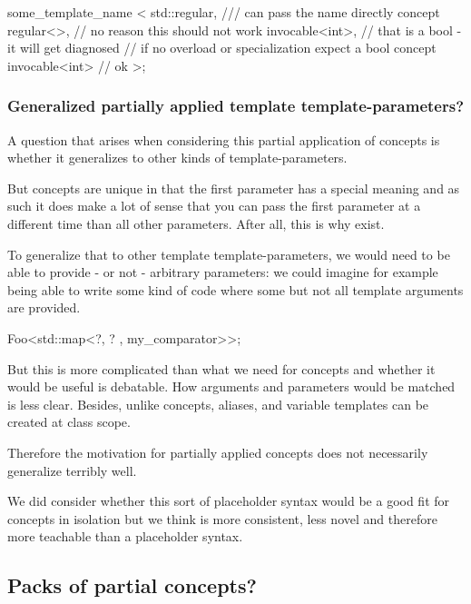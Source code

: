 \documentclass{wg21}
\begin{document}
\begin{colorblock}
some_template_name <
    std::regular,  /// can pass the name directly
    concept regular<>, // no reason this should not work
    invocable<int>, // that is a bool - it will get diagnosed
                    // if no overload or specialization expect a bool
    concept invocable<int> // ok
>;
\end{colorblock}

\subsubsection{Generalized partially applied template template-parameters?}

A question that arises when considering this partial application of concepts is whether it generalizes to other kinds of template-parameters.

But concepts are unique in that the first parameter has a special meaning and as such it does make a lot of sense
that you can pass the first parameter at a different time than all other parameters.
After all, this is why  exist.

To generalize that to other template template-parameters, we would need to be able to provide - or not - arbitrary parameters:
we could imagine for example being able to write some kind of code where some but not all template arguments are provided.

\begin{colorblock}
Foo<std::map<?, ? , my_comparator>>;
\end{colorblock}

But this is more complicated than what we need for concepts and whether it would be useful is debatable.
How arguments and parameters would be matched is less clear.
Besides, unlike concepts, aliases, and variable templates can be created at class scope.

Therefore the motivation for partially applied concepts does not necessarily generalize terribly well.

We did consider whether this sort of placeholder syntax would be a good fit for concepts in isolation but
we think  is more consistent, less novel and
therefore more teachable than a placeholder syntax.

\subsection{Packs of partial concepts?}
\end{document}
